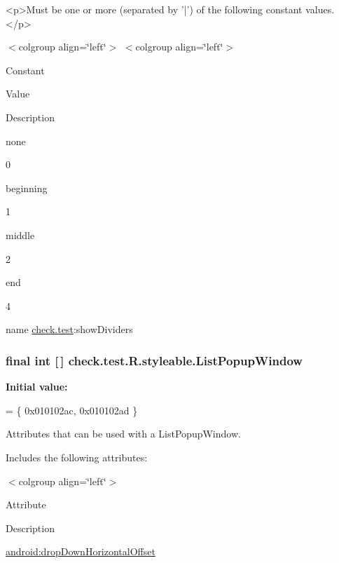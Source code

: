 \begin{DoxyVerb}      <p>Must be one or more (separated by '|') of the following constant values.</p>
\end{DoxyVerb}
 \begin{TabularC}{0}
\hline
\end{TabularC}
$<$colgroup align=\char`\"{}left\char`\"{}$>$ $<$colgroup align=\char`\"{}left\char`\"{}$>$ 

Constant

Value

Description 

{\ttfamily none}

0

{\ttfamily beginning}

1

{\ttfamily middle}

2

{\ttfamily end}

4

name \hyperlink{namespacecheck_1_1test}{check.\+test}\+:show\+Dividers \hypertarget{classcheck_1_1test_1_1_r_1_1styleable_a1d50d8182170e4c2bdda14aea31bd244}{}
\subsubsection[{List\+Popup\+Window}]{\setlength{\rightskip}{0pt plus 5cm}final int \mbox{[}$\,$\mbox{]} check.\+test.\+R.\+styleable.\+List\+Popup\+Window\hspace{0.3cm}{\ttfamily [static]}}\label{classcheck_1_1test_1_1_r_1_1styleable_a1d50d8182170e4c2bdda14aea31bd244}
{\bfseries Initial value\+:}
\begin{DoxyCode}
= \{
            0x010102ac, 0x010102ad
        \}
\end{DoxyCode}
Attributes that can be used with a List\+Popup\+Window. 

Includes the following attributes\+:

\begin{TabularC}{0}
\hline
\end{TabularC}
$<$colgroup align=\char`\"{}left\char`\"{}$>$ 

Attribute

Description 

{\ttfamily \hyperlink{classcheck_1_1test_1_1_r_1_1styleable_a4565a14e8b210c2b611dbd00fdbefbd4}{android\+:drop\+Down\+Horizontal\+Offset}}

